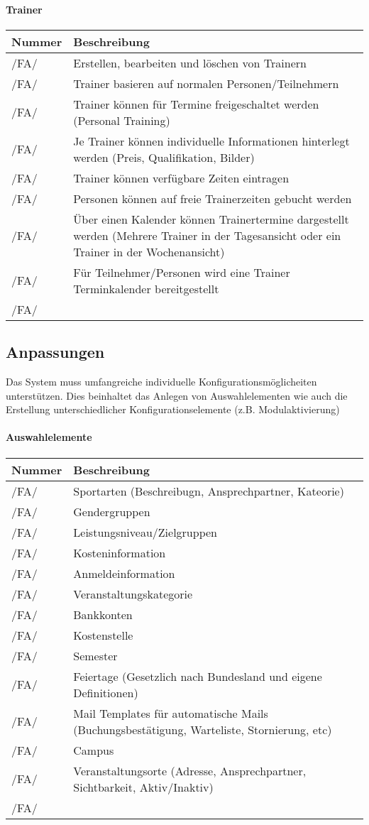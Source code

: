 \documentclass[a4paper,12pt]{article}
\newcommand\addrow[2]{#1 &#2\\ }
\newcommand\addheading[2]{#1 &#2\\ \hline}
\newcommand\tabularhead{\begin{tabular}{lp{13cm}}
\hline
}
\newenvironment{usecase}{\tabularhead}
{\hline\end{tabular}}
\begin{document}
\paragraph{\textbf{Trainer}\\}
\begin{usecase}
  \addheading{Nummer}{Beschreibung} 
  \addrow{/FA/}{Erstellen, bearbeiten und löschen von Trainern}
  \addrow{/FA/}{Trainer basieren auf normalen Personen/Teilnehmern}
  \addrow{/FA/}{Trainer können für Termine freigeschaltet werden (Personal Training)}
  \addrow{/FA/}{Je Trainer können individuelle Informationen hinterlegt werden (Preis, Qualifikation, Bilder)}
  \addrow{/FA/}{Trainer können verfügbare Zeiten eintragen}
  \addrow{/FA/}{Personen können auf freie Trainerzeiten gebucht werden}
  \addrow{/FA/}{Über einen Kalender können Trainertermine dargestellt werden (Mehrere Trainer in der Tagesansicht oder ein Trainer in der Wochenansicht)}
  \addrow{/FA/}{Für Teilnehmer/Personen wird eine Trainer Terminkalender bereitgestellt}
  \addrow{/FA/}{}
\end{usecase}

\subsection{Anpassungen}
Das System muss umfangreiche individuelle Konfigurationsmöglicheiten unterstützen. Dies beinhaltet das Anlegen von Auswahlelementen wie auch die Erstellung unterschiedlicher Konfigurationselemente (z.B. Modulaktivierung)
\paragraph{\textbf{Auswahlelemente}\\}

\begin{usecase}
  \addheading{Nummer}{Beschreibung} 
  \addrow{/FA/}{Sportarten (Beschreibugn, Ansprechpartner, Kateorie)}
  \addrow{/FA/}{Gendergruppen}
  \addrow{/FA/}{Leistungsniveau/Zielgruppen}
  \addrow{/FA/}{Kosteninformation}
  \addrow{/FA/}{Anmeldeinformation}
  \addrow{/FA/}{Veranstaltungskategorie}
  \addrow{/FA/}{Bankkonten}
  \addrow{/FA/}{Kostenstelle}
  \addrow{/FA/}{Semester}
  \addrow{/FA/}{Feiertage (Gesetzlich nach Bundesland und eigene Definitionen)}
  \addrow{/FA/}{Mail Templates für automatische Mails (Buchungsbestätigung, Warteliste, Stornierung, etc)}
  \addrow{/FA/}{Campus}
  \addrow{/FA/}{Veranstaltungsorte (Adresse, Ansprechpartner, Sichtbarkeit, Aktiv/Inaktiv)}
  \addrow{/FA/}{}
\end{usecase}
\end{document}

